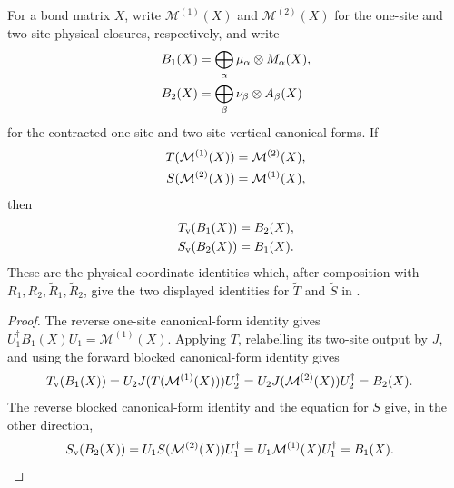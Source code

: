 \begin{lemma}
    \label{thm:mpdo_vertical_coordinate_map_transport}
    \leanok
    For a bond matrix $X$, write $\mathcal M^{(1)}(X)$ and
    $\mathcal M^{(2)}(X)$ for the one-site and two-site physical closures,
    respectively, and write
    \begin{align}
        B_1(X)
         & =\bigoplus_\alpha\mu_\alpha\otimes M_\alpha(X),
        \notag                                             \\
        B_2(X)
         & =\bigoplus_\beta\nu_\beta\otimes A_\beta(X)
        \notag
    \end{align}
    for the contracted one-site and two-site vertical canonical forms. If
    \begin{align}
        T(\mathcal M^{(1)}(X))
         & =\mathcal M^{(2)}(X),
        \notag                   \\
        S(\mathcal M^{(2)}(X))
         & =\mathcal M^{(1)}(X),
        \notag
    \end{align}
    then
    \begin{align}
        T_{\mathrm v}(B_1(X))
         & =B_2(X),
        \notag      \\
        S_{\mathrm v}(B_2(X))
         & =B_1(X).
        \notag
    \end{align}
    These are the physical-coordinate identities which, after composition
    with $R_1,R_2,\widetilde R_1,\widetilde R_2$, give the two displayed
    identities for $\widetilde T$ and $\widetilde S$ in
    \cite[Appendix~C.4, lines~1955--1979]{Cirac2016MPDO_arXiv}.
\end{lemma}

\begin{proof}\leanok
    The reverse one-site canonical-form identity gives
    $U_1^\dagger B_1(X)U_1=\mathcal M^{(1)}(X)$.
    Applying $T$, relabelling its two-site output by $J$, and using the
    forward blocked canonical-form identity gives
    \begin{align}
        T_{\mathrm v}(B_1(X))
         & =U_2J(T(\mathcal M^{(1)}(X)))U_2^\dagger
        =U_2J(\mathcal M^{(2)}(X))U_2^\dagger
        =B_2(X).
        \notag
    \end{align}
    The reverse blocked canonical-form identity and the equation for $S$
    give, in the other direction,
    \begin{align}
        S_{\mathrm v}(B_2(X))
         & =U_1S(\mathcal M^{(2)}(X))U_1^\dagger
        =U_1\mathcal M^{(1)}(X)U_1^\dagger
        =B_1(X).
        \notag
    \end{align}
\end{proof}

